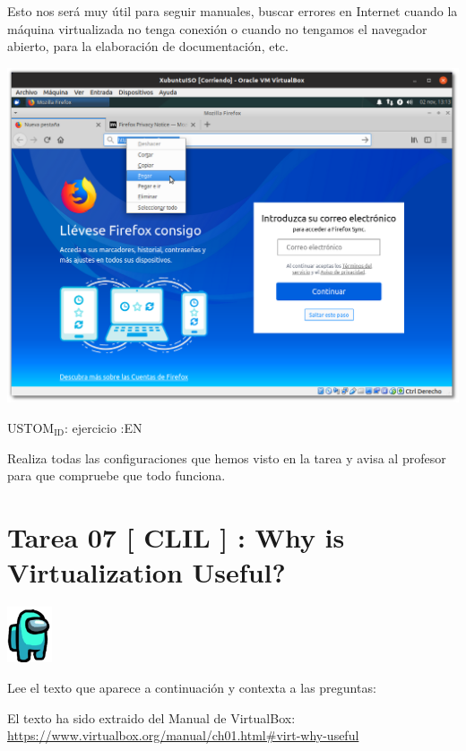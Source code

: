 \documentclass[11pt]{article}
\begin{document}
Esto nos será muy útil para seguir manuales, buscar errores en Internet
cuando la máquina virtualizada no tenga conexión o cuando no tengamos el
navegador abierto, para la elaboración de documentación, etc.

\begin{center}
\includegraphics[width=.9\linewidth]{imgs/VBox_GuestAdd_LinuX_027.png}
\end{center}

USTOM\(_{\text{ID}}\): ejercicio
  :EN

Realiza todas las configuraciones que hemos visto en la tarea y avisa al
profesor para que compruebe que todo funciona.

\newpag

\newpage
\section{Tarea 07 [ CLIL ] : Why is Virtualization Useful?}
\label{sec:orgabdd2f3}

\begin{center}
\includegraphics[width=50px]{imgs/amongus.png}
\end{center}


Lee el texto que aparece a continuación y contexta a las preguntas:

El texto ha sido extraido del Manual de VirtualBox:
\url{https://www.virtualbox.org/manual/ch01.html\#virt-why-useful}
\end{document}
